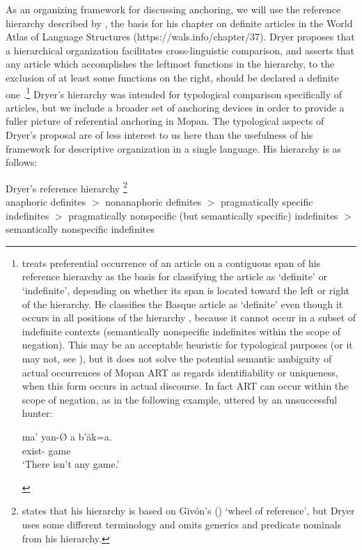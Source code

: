\documentclass[output=paper]{langsci/langscibook}
\begin{document}
As an organizing framework for discussing anchoring, we will use the reference hierarchy described by \cite[][e235]{dryer:14}, the basis for his chapter on definite articles in the World Atlas of Language Structures (https://wals.info/chapter/37).  Dryer proposes that a hierarchical organization facilitates cross-linguistic comparison, and asserts that any article which accomplishes the leftmost functions in the hierarchy, to the exclusion of at least some functions on the right, should be declared a definite one \citep[][e241]{dryer:14}.\footnote{\cite[][e237-238]{dryer:14} treats preferential occurrence of an article on a contiguous span of his reference hierarchy as the basis for classifying the article as `definite' or `indefinite', depending on whether its span is located toward the left or right of the hierarchy.  He classifies the Basque article as `definite' even though it occurs in all positions of the hierarchy \citep[][e239]{dryer:14}, because it cannot occur in a subset of indefinite contexts (semantically nonspecific indefinites within the scope of negation).  This may be an acceptable heuristic for typological purposes (or it may not, see \citealt{contini:morava:danziger:fc}), but it does not solve the potential semantic ambiguity of actual occurrences of Mopan ART as regards identifiability or uniqueness, when this form occurs in actual discourse. In fact ART can occur within the scope of negation, as in the following example, uttered by an unsuccessful hunter:
\vspace*{-2mm}
\begin{exe}
\exi{}
\gll 	ma' 		yan-{\O}	 	a 	b'\"ak=a. \\
	{}	exist-{}	{}	game{} \\
\glt 	`There isn't any game.'
\end{exe}
} 
Dryer's hierarchy was intended for typological comparison specifically of articles, but we include a broader set of anchoring devices in order to provide a fuller picture of referential anchoring in Mopan. The typological aspects of Dryer's proposal are of less interest to us here than the usefulness of his framework for descriptive organization in a single language.  His hierarchy is as follows:

\begin{exe}
\exi{}
Dryer's reference hierarchy \citep[][e235]{dryer:14}\footnote{{\cite[][e235]{dryer:14} states that his hierarchy is based on Giv\'on's (\citeyear{givon:78}) `wheel of reference', but Dryer uses some different terminology and omits generics and predicate nominals from his hierarchy.}} \\
anaphoric definites $>$ nonanaphoric definites $>$ pragmatically specific indefinites $>$ pragmatically nonspecific (but semantically specific) indefinites $>$ semantically nonspecific indefinites
\end{exe}
\end{document}
